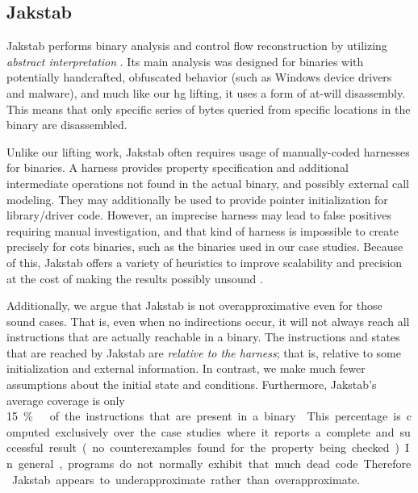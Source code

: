 \subsection{Jakstab}\label{related-jakstab}
Jakstab performs binary analysis and control flow reconstruction by utilizing
\emph{abstract interpretation} \autocite{cousot1976static,cousot1977abstract}.
Its main analysis was designed for binaries with potentially handcrafted, obfuscated behavior (such as Windows device drivers and malware),
and much like our \gls{hg} lifting, it uses a form of at-will disassembly.
This means that only specific series of bytes queried from specific locations in the binary are disassembled.

Unlike our lifting work, Jakstab often requires usage of manually-coded harnesses for binaries.
A harness provides property specification and additional intermediate operations not found in the actual binary, and possibly external call modeling.
They may additionally be used to provide pointer initialization for library/driver code.
However, an imprecise harness may lead to false positives requiring manual investigation, and that kind of harness is impossible to create precisely for \gls{cots} binaries, such as the binaries used in our case studies.
Because of this, Jakstab offers a variety of heuristics to improve scalability and precision at the cost of making the results possibly unsound  \autocite[129]{kinder2010static}.

Additionally, we argue that Jakstab is not overapproximative even for those sound cases.
That is, even when no indirections occur, it will not always reach all instructions that are actually reachable in a binary.
The instructions and states that are reached by Jakstab
are \emph{relative to the harness}; that is, relative to some initialization
and external information.
In contrast, we make much fewer assumptions about the initial state and conditions.
Furthermore, Jakstab's average coverage is only \SI{15}\percent\ of the instructions that are present in a binary \autocite[Table~6.2]{kinder2010static}.
This percentage is computed exclusively over the case studies where it reports a complete and successful result (no counterexamples found for the property being checked).
In general, programs do not normally exhibit that much dead code.
Therefore Jakstab appears to underapproximate rather than overapproximate.

